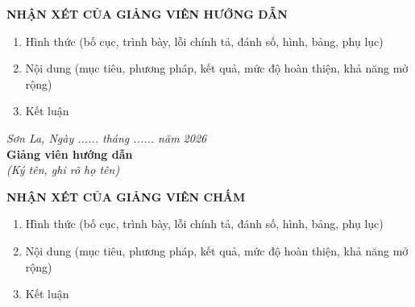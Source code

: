 \documentclass[13pt,a4paper]{extarticle}
\numberwithin{figure}{section}
\numberwithin{table}{section}
\begin{document}
	\newpage
	\begin{center}
		\textbf{NHẬN XÉT CỦA GIẢNG VIÊN HƯỚNG DẪN}
	\end{center}
	
	\vspace{1cm}
	
	\begin{enumerate}
		\item Hình thức (bố cục, trình bày, lỗi chính tả, đánh số, hình, bảng, phụ lục)
		
		\vspace{3cm}
		
		\item Nội dung (mục tiêu, phương pháp, kết quả, mức độ hoàn thiện, khả năng mở rộng)
		
		\vspace{3cm}
		
		\item Kết luận
		
		\vspace{3cm}
	\end{enumerate}
	
	\vspace{1cm}
	
	\begin{flushright}
		\textit{Sơn La, Ngày ...... tháng ...... năm 2026}\\[0.5cm]
		\textbf{Giảng viên hướng dẫn}\\[0.3cm]
		\textit{(Ký tên, ghi rõ họ tên)}
	\end{flushright}
	
	\newpage
	\begin{center}
		\textbf{NHẬN XÉT CỦA GIẢNG VIÊN CHẤM}
	\end{center}
	
	\vspace{1cm}
	
	\begin{enumerate}
		\item Hình thức (bố cục, trình bày, lỗi chính tả, đánh số, hình, bảng, phụ lục)
		
		\vspace{3cm}
		
		\item Nội dung (mục tiêu, phương pháp, kết quả, mức độ hoàn thiện, khả năng mở rộng)
		
		\vspace{3cm}
		
		\item Kết luận
		
		\vspace{3cm}
	\end{enumerate}
	
\end{document}
